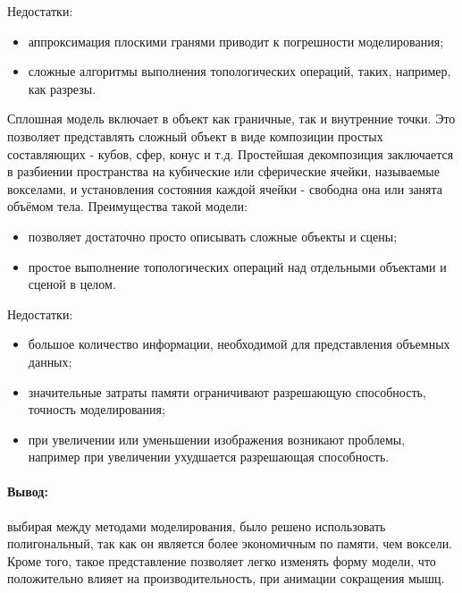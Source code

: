Недостатки:
\begin{itemize}
	\item аппроксимация плоскими гранями приводит к погрешности моделирования;
	\item сложные алгоритмы выполнения топологических операций, таких, например, как разрезы.
\end{itemize}
\par Сплошная модель включает в объект как граничные, так и внутренние точки. Это позволяет представлять сложный объект в виде композиции простых составляющих - кубов, сфер, конус и т.д. Простейшая декомпозиция заключается в разбиении пространства на кубические или сферические ячейки, называемые вокселами, и установления состояния каждой ячейки - свободна она или занята объёмом тела. Преимущества такой модели:
\begin{itemize}
	\item позволяет достаточно просто описывать сложные объекты и сцены;
	\item простое выполнение топологических операций над отдельными объектами и сценой в целом.
\end{itemize}
Недостатки:
\begin{itemize}
	\item большое количество информации, необходимой для представления объемных данных;
	\item значительные затраты памяти ограничивают разрешающую способность, точность моделирования;
	\item при увеличении или уменьшении изображения возникают проблемы, например при увеличении ухудшается разрешающая способность.
\end{itemize}
\paragraph{Вывод:} выбирая между методами моделирования, было решено использовать полигональный, так как он является более экономичным по памяти, чем воксели. Кроме того, такое представление позволяет легко изменять форму модели, что положительно влияет на производительность, при анимации сокращения мышц. 

